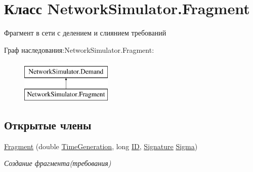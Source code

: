 \hypertarget{class_network_simulator_1_1_fragment}{}\section{Класс Network\+Simulator.\+Fragment}
\label{class_network_simulator_1_1_fragment}


Фрагмент в сети с делением и слиянием требований  


Граф наследования\+:Network\+Simulator.\+Fragment\+:\begin{figure}[H]
\begin{center}
\leavevmode
\includegraphics[height=2.000000cm]{class_network_simulator_1_1_fragment}
\end{center}
\end{figure}
\subsection*{Открытые члены}
\begin{DoxyCompactItemize}
\item 
\hyperlink{class_network_simulator_1_1_fragment_a945eb2690fcad45cc07ed52c047ce763}{Fragment} (double \hyperlink{class_network_simulator_1_1_demand_abd1660da7871505ae8ad8dd282dc3d29}{Time\+Generation}, long \hyperlink{class_network_simulator_1_1_demand_af9ba0cb40b82eb7be679676425cad207}{ID}, \hyperlink{class_network_simulator_1_1_signature}{Signature} \hyperlink{class_network_simulator_1_1_fragment_a4a04d76e80868fe6ea72fc453d946218}{Sigma})
\begin{DoxyCompactList}\small\item\em Создание фрагмента(требования) \end{DoxyCompactList}\end{DoxyCompactItemize}
